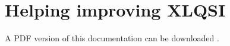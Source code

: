\documentclass[letterpaper,10pt,english]{sphinxmanual}
\begin{document}
\chapter{Helping improving XLQSI}
\label{\detokenize{contribute::doc}}\label{\detokenize{contribute:helping-improving-xlqsi}}
A PDF version of this documentation can be downloaded .



\renewcommand{\indexname}{Index}
\printindex
\end{document}
